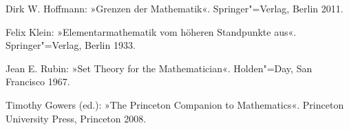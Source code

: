 
\begin{thebibliography}{00}

Dirk W. Hoffmann: »Grenzen der Mathematik«.
Springer"=Verlag, Berlin 2011.

Felix Klein: »Elementarmathematik vom höheren Standpunkte aus«.\\
Springer"=Verlag, Berlin 1933.

Jean E. Rubin: »Set Theory for the Mathematician«.
Holden"=Day, San Francisco 1967.

Timothy Gowers (ed.): »The Princeton Companion to Mathematics«.
Princeton University Press, Princeton 2008.

\end{thebibliography}
